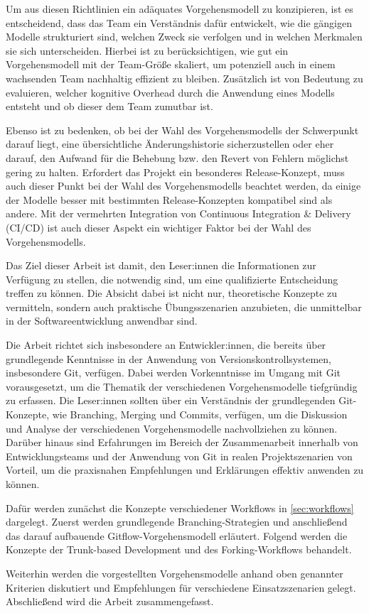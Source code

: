 Um aus diesen Richtlinien ein adäquates Vorgehensmodell zu konzipieren, ist es entscheidend, dass das Team ein Verständnis dafür entwickelt, wie die gängigen Modelle strukturiert sind, welchen Zweck sie verfolgen und in welchen Merkmalen sie sich unterscheiden. Hierbei ist zu berücksichtigen, wie gut ein Vorgehensmodell mit der Team\hyp Größe skaliert, um potenziell auch in einem wachsenden Team nachhaltig effizient zu bleiben. Zusätzlich ist von Bedeutung zu evaluieren, welcher kognitive Overhead durch die Anwendung eines Modells entsteht und ob dieser dem Team zumutbar ist.

Ebenso ist zu bedenken, ob bei der Wahl des Vorgehensmodells der Schwerpunkt darauf liegt, eine übersichtliche Änderungshistorie sicherzustellen oder eher darauf, den Aufwand für die Behebung bzw. den Revert von Fehlern möglichst gering zu halten. Erfordert das Projekt ein besonderes Release\hyp Konzept, muss auch dieser Punkt bei der Wahl des Vorgehensmodells beachtet werden, da einige der Modelle besser mit bestimmten Release\hyp Konzepten kompatibel sind als andere. Mit der vermehrten Integration von Continuous Integration \& Delivery (CI/CD) ist auch dieser Aspekt ein wichtiger Faktor bei der Wahl des Vorgehensmodells.

Das Ziel dieser Arbeit ist damit, den Leser:innen die Informationen zur Verfügung zu stellen, die notwendig sind, um eine qualifizierte Entscheidung treffen zu können. Die Absicht dabei ist nicht nur, theoretische Konzepte zu vermitteln, sondern auch praktische Übungsszenarien anzubieten, die unmittelbar in der Softwareentwicklung anwendbar sind. 

Die Arbeit richtet sich insbesondere an Entwickler:innen, die bereits über grundlegende Kenntnisse in der Anwendung von Versionskontrollsystemen, insbesondere Git, verfügen. Dabei werden Vorkenntnisse im Umgang mit Git vorausgesetzt, um die Thematik der verschiedenen Vorgehensmodelle tiefgründig zu erfassen. Die Leser:innen sollten über ein Verständnis der grundlegenden Git\hyp Konzepte, wie Branching, Merging und Commits, verfügen, um die Diskussion und Analyse der verschiedenen Vorgehensmodelle nachvollziehen zu können. Darüber hinaus sind Erfahrungen im Bereich der Zusammenarbeit innerhalb von Entwicklungsteams und der Anwendung von Git in realen Projektszenarien von Vorteil, um die praxisnahen Empfehlungen und Erklärungen effektiv anwenden zu können.

Dafür werden zunächst die Konzepte verschiedener Workflows in \autoref{sec:workflows} dargelegt. Zuerst werden grundlegende Branching\hyp Strategien und anschließend das darauf aufbauende Gitflow\hyp Vorgehensmodell erläutert. Folgend werden die Konzepte der Trunk\hyp based Development und des Forking\hyp Workflows behandelt.

Weiterhin werden die vorgestellten Vorgehensmodelle anhand oben genannter Kriterien diskutiert und Empfehlungen für verschiedene Einsatzszenarien gelegt. Abschließend wird die Arbeit zusammengefasst.

